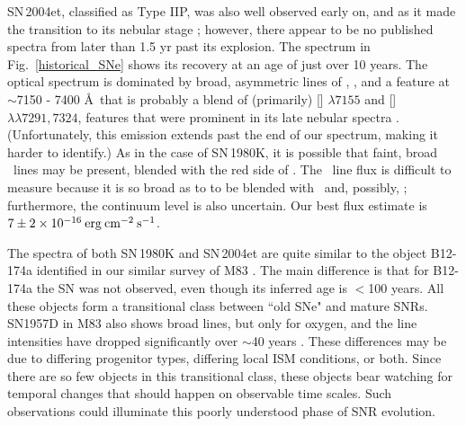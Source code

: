 SN\,2004et, classified as Type IIP, was also well observed early on, and as it made the transition to its nebular stage \citep[e.g.,][]{sahu06, maguire10, jerkstrand12}; however, there appear to be no published spectra from later than 1.5 yr past its explosion.  The spectrum in Fig.~\ref{historical_SNe} shows its recovery at an age of just over 10 years.  The optical spectrum is dominated by broad, asymmetric lines of \ha, \oi, and a feature at $\sim$7150 - 7400 \AA\ that is probably a blend of (primarily)  [] $\lambda 7155$ and [] $\lambda\lambda 7291, 7324$, features that were prominent in its late nebular spectra \citep{sahu06, maguire10}.  (Unfortunately, this emission extends past the end of our spectrum, making it harder to identify.)  As in the case of SN\,1980K, it is possible that faint, broad \SiiL\ lines may be present, blended with the red side of \ha.  The \ha\ line flux is difficult to measure because it is so broad as to to be blended with \oi\ and, possibly, \sii; furthermore, the continuum level is also uncertain.  Our best flux estimate is $7 \pm 2 \times 10^{-16} \:{\rm erg\:cm^{-2}\:s^{-1}}$.


The spectra of both SN\,1980K and SN\,2004et are quite  similar to the object B12-174a identified in our similar survey of M83 \citep{blair15}. The main difference is that for B12-174a the SN was not observed, even though its inferred age is $<$100 years.  All these objects form a transitional class between ``old SNe" and mature SNRs.  SN1957D in M83 also shows broad lines, but only for oxygen, and the line intensities have dropped significantly over $\sim$40 years \citep[][and references therein]{long12}.  These differences may be due to differing progenitor types, differing local ISM conditions, or both.  \citep[The \oiii\ lines would appear relatively stronger in both  SN\,1980K and SN\,2004et if these were dereddened, with $E(B-V) = 0.41$,][but even so they would not be nearly so O-dominated as SN\,1957D.]{fesen99b, sahu06} Since there are so few objects in this transitional class, these objects bear watching for temporal changes that should happen on observable time scales.  Such observations could illuminate this poorly understood phase of SNR evolution.

